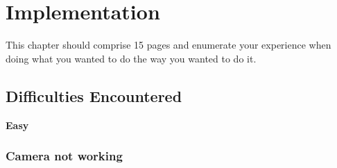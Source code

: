 \chapter{Implementation}
\label{chap:imp}
This chapter should comprise 15 pages and enumerate your experience when doing what you wanted to do the way you wanted to do it. 

\section{Difficulties Encountered}


 \item \textbf{Easy}
 \item \subsection{ \textbf{Camera not working } }


